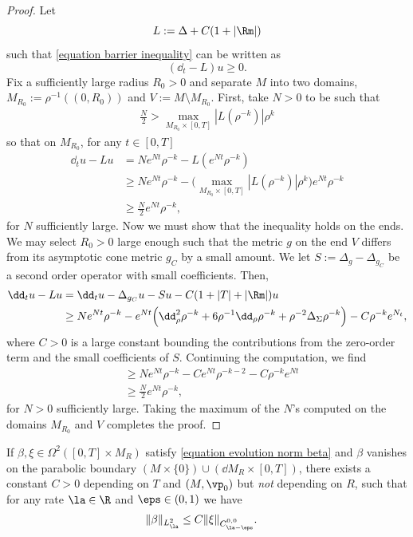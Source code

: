 \documentclass[hidelinks, 12pt, oneside, reqno]{amsart}
\begin{document}
\begin{proof}
    Let 
    \[
    L :=\Delta + C(1  + |\Rm|) 
    \]
    such that \eqref{equation barrier inequality} can be written as
    \[
    (\dd_t - L)u \ge 0.
    \]
    Fix a sufficiently large radius $R_0 > 0$ and separate $M$ into two domains, $M_{R_0} := \rho^{-1}((0,R_0))$ and $V := M \setminus M_{R_0}$. First, take $N > 0$ to be such that
    \begin{align*}
        \frac{N}{2} > \max_{M_{R_0} \times [0,T]} |L(\rho^{-k})| \rho^k
    \end{align*}
    so that on $M_{R_0}$, for any $t \in [0,T]$
    \begin{align*}
        \dd_t u - Lu &= Ne^{Nt}\rho^{-k} - L(e^{Nt}\rho^{-k})\\
        &\ge Ne^{Nt}\rho^{-k} - \big(\max_{M_{R_0} \times [0,T]} |L(\rho^{-k})| \rho^{k}\big) e^{Nt} \rho^{-k} \\
        & \ge \frac{N}{2}e^{Nt}\rho^{-k},
    \end{align*}
for $N$ sufficiently large. Now we must show that the inequality holds on the ends. We may select $R_0 > 0$ large enough such that the metric $g$ on the end $V$ differs from its asymptotic cone metric $g_{C}$ by a small amount. We let $ S := \Delta_{g} - \Delta_{g_{C}}$ be a second order operator with small coefficients. Then,
\begin{align*}
    \dd_t u - Lu &= \dd_t u - \Delta_{g_{C}} u - S u -  C(1 + |T| + |\Rm|) u \\
    &\ge Ne^{Nt}\rho^{-k} - e^{Nt}\Big(\dd^2_\rho \rho^{-k} + 6\rho^{-1}\dd_\rho \rho^{-k} + \rho^{-2} \Delta_{\Sigma} \rho^{-k}\Big) - C\rho^{-k}e^{N_t}, 
\end{align*}
where $C > 0$ is a large constant bounding the contributions from the zero-order term and the small coefficients of $S$. Continuing the computation, we find
\begin{align*}
    & \ge Ne^{Nt}\rho^{-k} - Ce^{Nt} \rho^{-k-2} - C\rho^{-k}e^{Nt} \\
    & \ge \frac{N}{2}e^{Nt}\rho^{-k},
\end{align*}
for $N > 0$ sufficiently large. Taking the maximum of the $N$'s computed on the domains $M_{R_0}$ and $V$ completes the proof. 
\end{proof}

\begin{cor}\label{corollary apriori estimate on L2 norm of solution}
    If $\beta, \xi \in \Omega^2([0,T] \times M_R)$ satisfy \eqref{equation evolution norm beta} and $\beta$ vanishes on the parabolic boundary $(M \times \{0\}) \cup (\dd M_R \times [0,T])$, there exists a constant $C>0$ depending on $T$ and $(M,\vp_0)$ but \emph{not} depending on $R$, such that for any rate $\la \in \R$ and $\eps \in (0,1)$ we have
    \begin{align*}
    \|\beta\|_{L^2_{\la}} &\le C\|\xi\|_{C^{0,0}_{\la - \eps}}.
    \end{align*}
\end{cor}
\end{document}
